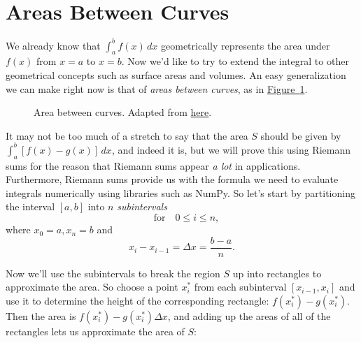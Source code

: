 \documentclass[10pt,]{book}
\numberwithin{equation}{section}
\begin{document}
\section[{Areas Between Curves}]{Areas Between Curves}\label{section-areas-between-curves}
\hypertarget{p-613}{}%
We already know that \(\int_{a}^{b}f(x)\,dx\) geometrically represents the area under \(f(x)\) from \(x = a\) to \(x = b\). Now we'd like to try to extend the integral to other geometrical concepts such as surface areas and volumes. An easy generalization we can make right now is that of \emph{areas between curves}, as in \hyperref[figure-area-between-curves]{Figure~\ref{figure-area-between-curves}}.%
\begin{figure}
\centering
{
}
\caption{Area between curves. Adapted from \href{https://tex.stackexchange.com/questions/164773/graphics-area-between-curves}{here}.\label{figure-area-between-curves}}
\end{figure}
\hypertarget{p-614}{}%
It may not be too much of a stretch to say that the area \(S\) should be given by \(\int_{a}^{b}[f(x) - g(x)]\,dx\), and indeed it is, but we will prove this using Riemann sums for the reason that Riemann sums appear \emph{a lot} in applications. Furthermore, Riemann sums provide us with the formula we need to evaluate integrals numerically using libraries such as NumPy. So let's start by partitioning the interval \([a,b]\) into \(n\) \emph{subintervals}%
\begin{equation*}
[x_{i-1},x_{i}]\quad\text{for}\quad 0\leq i\leq n,
\end{equation*}
where \(x_{0} = a, x_{n} = b\) and%
\begin{equation*}
x_{i} - x_{i-1} = \Delta x = \frac{b-a}{n}.
\end{equation*}
%
\par
\hypertarget{p-615}{}%
Now we'll use the subintervals to break the region \(S\) up into rectangles to approximate the area. So choose a point \(x_{i}^{*}\) from each subinterval \([x_{i-1}, x_{i}]\) and use it to determine the height of the corresponding rectangle: \(f(x_{i}^{*}) - g(x_{i}^{*})\). Then the area is \(f(x_{i}^{*}) - g(x_{i}^{*})\Delta x\), and adding up the areas of all of the rectangles lets us approximate the area of \(S\):%
\end{document}
